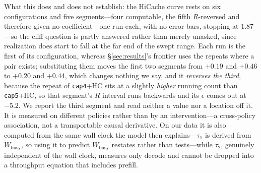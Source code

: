 What this does and does not establish: the HiCache curve
rests on six configurations and five segments---four computable, the fifth
$\overline{R}$-reversed and therefore given no coefficient---one run each, with
no error bars, stopping at 1.87---so the cliff question is partly answered
rather than merely unasked, since realization does start to fall at the far end
of the swept range. Each run is the first of its configuration, whereas
\S\ref{sec:results}'s frontier uses the
repeats where a pair exists; substituting them moves the first two segments
from $+0.19$ and $+0.46$ to $+0.20$ and $+0.44$, which changes nothing we say,
and it \emph{reverses the third}, because the repeat of \texttt{cap4}+HC sits
at a slightly \emph{higher} running count than \texttt{cap5}+HC, so that
segment's $\overline{R}$ interval runs backwards and its $\epsilon$ comes out
at $-5.2$. We report the third segment and read neither a value nor a location
off it. It is measured on different policies rather than by an
intervention---a cross-policy association, not a transportable causal
derivative. On our data it is also computed from the same wall clock the model
then explains---$\tau_1$ is derived from $W_{\text{busy}}$, so using
it to predict $W_{\text{busy}}$ restates rather than tests---while $\tau_2$,
genuinely independent of the wall clock, measures only decode and cannot be
dropped into a throughput equation that includes prefill.

